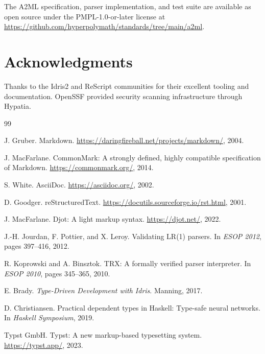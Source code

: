 \documentclass[10pt,twocolumn]{article}
\begin{document}
The A2ML specification, parser implementation, and test suite are available as open source under the PMPL-1.0-or-later license at \url{https://github.com/hyperpolymath/standards/tree/main/a2ml}.

\section*{Acknowledgments}

Thanks to the Idris2 and ReScript communities for their excellent tooling and documentation. OpenSSF provided security scanning infrastructure through Hypatia.

\begin{thebibliography}{99}

J. Gruber.
\newblock Markdown.
\newblock \url{https://daringfireball.net/projects/markdown/}, 2004.

J. MacFarlane.
\newblock CommonMark: A strongly defined, highly compatible specification of Markdown.
\newblock \url{https://commonmark.org/}, 2014.

S. White.
\newblock AsciiDoc.
\newblock \url{https://asciidoc.org/}, 2002.

D. Goodger.
\newblock reStructuredText.
\newblock \url{https://docutils.sourceforge.io/rst.html}, 2001.

J. MacFarlane.
\newblock Djot: A light markup syntax.
\newblock \url{https://djot.net/}, 2022.

J.-H. Jourdan, F. Pottier, and X. Leroy.
\newblock Validating LR(1) parsers.
\newblock In \emph{ESOP 2012}, pages 397--416, 2012.

R. Koprowski and A. Binsztok.
\newblock TRX: A formally verified parser interpreter.
\newblock In \emph{ESOP 2010}, pages 345--365, 2010.

E. Brady.
\newblock \emph{Type-Driven Development with Idris}.
\newblock Manning, 2017.

D. Christiansen.
\newblock Practical dependent types in Haskell: Type-safe neural networks.
\newblock In \emph{Haskell Symposium}, 2019.

Typst GmbH.
\newblock Typst: A new markup-based typesetting system.
\newblock \url{https://typst.app/}, 2023.

\end{thebibliography}
\end{document}
